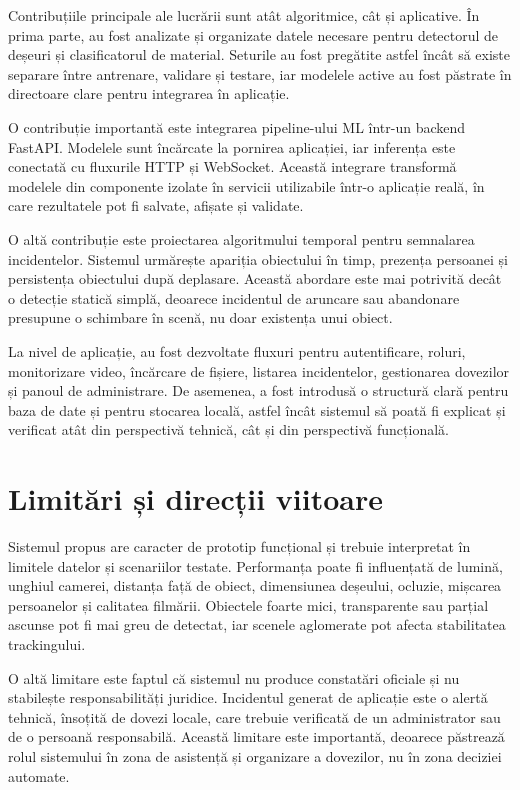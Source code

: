 Contribuțiile principale ale lucrării sunt atât algoritmice, cât și aplicative. În prima parte, au fost analizate și organizate datele necesare pentru detectorul de deșeuri și clasificatorul de material. Seturile au fost pregătite astfel încât să existe separare între antrenare, validare și testare, iar modelele active au fost păstrate în directoare clare pentru integrarea în aplicație.

O contribuție importantă este integrarea pipeline-ului ML într-un backend FastAPI. Modelele sunt încărcate la pornirea aplicației, iar inferența este conectată cu fluxurile HTTP și WebSocket. Această integrare transformă modelele din componente izolate în servicii utilizabile într-o aplicație reală, în care rezultatele pot fi salvate, afișate și validate.

O altă contribuție este proiectarea algoritmului temporal pentru semnalarea incidentelor. Sistemul urmărește apariția obiectului în timp, prezența persoanei și persistența obiectului după deplasare. Această abordare este mai potrivită decât o detecție statică simplă, deoarece incidentul de aruncare sau abandonare presupune o schimbare în scenă, nu doar existența unui obiect.

La nivel de aplicație, au fost dezvoltate fluxuri pentru autentificare, roluri, monitorizare video, încărcare de fișiere, listarea incidentelor, gestionarea dovezilor și panoul de administrare. De asemenea, a fost introdusă o structură clară pentru baza de date și pentru stocarea locală, astfel încât sistemul să poată fi explicat și verificat atât din perspectivă tehnică, cât și din perspectivă funcțională.

\section*{Limitări și direcții viitoare}
{}

Sistemul propus are caracter de prototip funcțional și trebuie interpretat în limitele datelor și scenariilor testate. Performanța poate fi influențată de lumină, unghiul camerei, distanța față de obiect, dimensiunea deșeului, ocluzie, mișcarea persoanelor și calitatea filmării. Obiectele foarte mici, transparente sau parțial ascunse pot fi mai greu de detectat, iar scenele aglomerate pot afecta stabilitatea trackingului.

O altă limitare este faptul că sistemul nu produce constatări oficiale și nu stabilește responsabilități juridice. Incidentul generat de aplicație este o alertă tehnică, însoțită de dovezi locale, care trebuie verificată de un administrator sau de o persoană responsabilă. Această limitare este importantă, deoarece păstrează rolul sistemului în zona de asistență și organizare a dovezilor, nu în zona deciziei automate.

